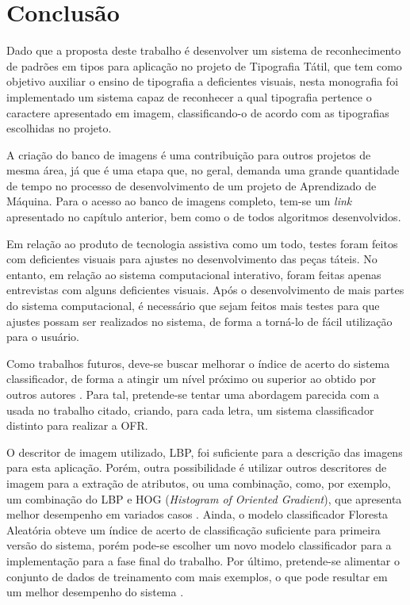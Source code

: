 \chapter{Conclusão}
\label{ch:Conclusao}

Dado que a proposta deste trabalho é desenvolver um sistema de reconhecimento de padrões em tipos para aplicação no projeto de Tipografia Tátil, que tem como objetivo auxiliar o ensino de tipografia a deficientes visuais, nesta monografia foi implementado um sistema capaz de reconhecer a qual tipografia pertence o caractere apresentado em imagem, classificando-o de acordo com as tipografias escolhidas no projeto.

A criação do banco de imagens é uma contribuição para outros projetos de mesma área, já que é uma etapa que, no geral, demanda uma grande quantidade de tempo no processo de desenvolvimento de um projeto de Aprendizado de Máquina. Para o acesso ao banco de imagens completo, tem-se um \textit{link} apresentado no capítulo anterior, bem como o de todos algoritmos desenvolvidos.

Em relação ao produto de tecnologia assistiva como um todo, testes foram feitos com deficientes visuais para ajustes no desenvolvimento das peças táteis. No entanto, em relação ao sistema computacional interativo, foram feitas apenas entrevistas com alguns deficientes visuais. Após o desenvolvimento de mais partes do sistema computacional, é necessário que sejam feitos mais testes para que ajustes possam ser realizados no sistema, de forma a torná-lo de fácil utilização para o usuário.

Como trabalhos futuros, deve-se buscar melhorar o índice de acerto do sistema classificador, de forma a atingir um nível próximo ou superior ao obtido por outros autores . Para tal, pretende-se tentar uma abordagem parecida com a usada no trabalho citado, criando, para cada letra, um sistema classificador distinto para realizar a OFR.

 O descritor de imagem utilizado, LBP, foi suficiente para a descrição das imagens para esta aplicação. Porém, outra possibilidade é utilizar outros descritores de imagem para a extração de atributos, ou uma combinação, como, por exemplo, um combinação do LBP e HOG (\textit{Histogram of Oriented Gradient}), que apresenta melhor desempenho em variados casos  . Ainda, o modelo classificador Floresta Aleatória obteve um índice de acerto de classificação suficiente para primeira versão do sistema, porém pode-se escolher um novo modelo classificador para a implementação para a fase final do trabalho. Por último, pretende-se alimentar o conjunto de dados de treinamento com mais exemplos, o que pode resultar em um melhor desempenho do sistema .


